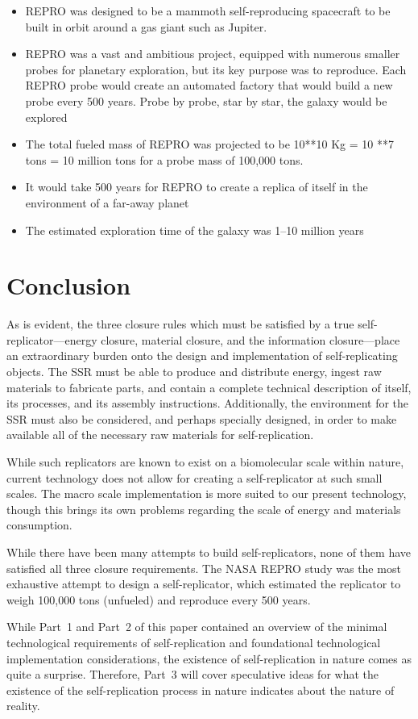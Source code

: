 \begin{itemize}
\item REPRO was designed to be a mammoth self-reproducing spacecraft to be built in
orbit around a gas giant such as Jupiter.
\item REPRO was a vast and ambitious project, equipped with numerous
smaller probes for planetary exploration, but its key purpose was to
reproduce. Each REPRO probe would create an automated factory that
would build a new probe every 500 years. Probe by probe, star by star,
the galaxy would be explored 
\item The total fueled mass of REPRO was projected to be 10**10 Kg = 10
**7 tons = 10 million tons for a probe mass of 100,000 tons.
\item It would take 500 years for REPRO to create a replica of itself in the
environment of a far-away planet
\item The estimated exploration time of the galaxy was 1--10 million
years
\end{itemize}

\section{Conclusion}

As is evident, the three closure rules which must be satisfied by a
true self-replicator---energy closure, material closure, 
and the information closure---place an extraordinary burden onto
the design and implementation of self-replicating objects.  The
SSR must be able to produce and distribute energy, ingest raw
materials to fabricate parts, and contain a complete technical
description of itself, its processes, and its assembly instructions.
Additionally, the environment for the SSR must also be considered, 
and perhaps specially designed, in order to make available all
of the necessary raw materials for self-replication.

While such replicators are known to exist on a biomolecular scale within nature,
current technology does not allow for creating a self-replicator 
at such small scales.  The macro scale implementation is more suited
to our present technology, though this brings its own problems regarding 
the scale of energy and materials consumption.  

While there have been many attempts to build self-replicators, none of them have
satisfied all three closure requirements.  The NASA REPRO study was the most
exhaustive attempt to design a self-replicator, which estimated the replicator
to weigh 100,000 tons (unfueled) and reproduce every 500 years.

While Part~1 and Part~2 of this paper contained an overview of the minimal technological
requirements of self-replication and foundational technological implementation considerations,
the existence of self-replication in nature comes as quite a surprise.  Therefore, Part~3
will cover speculative ideas for what the existence of the self-replication process in
nature indicates about the nature of reality.


